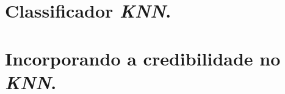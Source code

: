 

\section{Classificador \textit{KNN}.}
\label{subsec::cred_knn}


\section{Incorporando a credibilidade no \textit{KNN}.}
\label{subsubsec::knn_cred}


